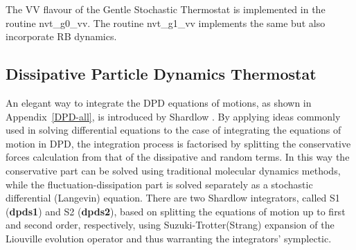 The VV flavour of the Gentle Stochastic Thermostat is implemented in
the \D routine {\sc nvt\_g0\_vv}.
The routine {\sc nvt\_g1\_vv} implements the
same but also incorporate RB dynamics.

\subsection{Dissipative Particle Dynamics Thermostat} \label{dpd}

An elegant way to integrate the DPD equations of motions, as shown
in Appendix~\ref{DPD-all}, is introduced by Shardlow \cite{shardlow-03a}.
By applying ideas commonly used in solving differential equations
to the case of integrating the equations of motion in DPD, the
integration process is factorised by splitting the conservative forces
calculation from that of the dissipative and random terms.  In this way
the conservative part can be solved using traditional molecular dynamics
methods, while the fluctuation-dissipation part is solved separately as
a stochastic differential (Langevin) equation.  There are two Shardlow
integrators, called S1 ({\bf dpds1}) and S2 ({\bf dpds2}), based on
splitting the equations of motion up to first and second order,
respectively, using Suzuki-Trotter(Strang) expansion of the Liouville
evolution operator and thus warranting the integrators' symplectic.

